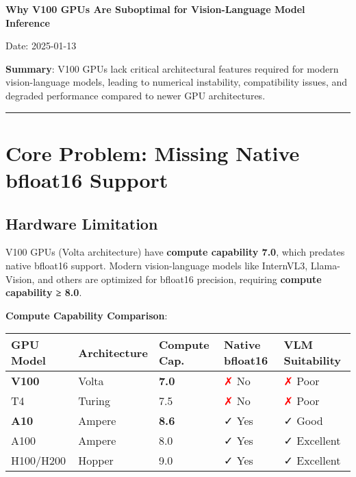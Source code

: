 \documentclass[11pt,a4paper]{article}
\newcommand{\cmark}{\textcolor{green!70!black}{✓}}
\newcommand{\xmark}{\textcolor{red}{✗}}
\begin{document}
\begin{center}
{\LARGE\bfseries Why V100 GPUs Are Suboptimal for Vision-Language Model Inference}

\vspace{0.5cm}

{\large Date: 2025-01-13}

\vspace{0.3cm}

\begin{minipage}{0.9\textwidth}
\textbf{Summary}: V100 GPUs lack critical architectural features required for modern vision-language models, leading to numerical instability, compatibility issues, and degraded performance compared to newer GPU architectures.
\end{minipage}
\end{center}

\vspace{0.5cm}
\hrule
\vspace{0.5cm}

\section{Core Problem: Missing Native bfloat16 Support}

\subsection{Hardware Limitation}

V100 GPUs (Volta architecture) have \textbf{compute capability 7.0}, which predates native bfloat16 support. Modern vision-language models like InternVL3, Llama-Vision, and others are optimized for bfloat16 precision, requiring \textbf{compute capability ≥ 8.0}.

\vspace{0.3cm}
\noindent\textbf{Compute Capability Comparison}:

\begin{table}[h]
\centering
\begin{tabular}{lllll}
\toprule
\textbf{GPU Model} & \textbf{Architecture} & \textbf{Compute Cap.} & \textbf{Native bfloat16} & \textbf{VLM Suitability} \\
\midrule
\textbf{V100} & Volta & \textbf{7.0} & \xmark{} No & \xmark{} Poor \\
T4 & Turing & 7.5 & \xmark{} No & \xmark{} Poor \\
\textbf{A10} & Ampere & \textbf{8.6} & \cmark{} Yes & \cmark{} Good \\
A100 & Ampere & 8.0 & \cmark{} Yes & \cmark{} Excellent \\
H100/H200 & Hopper & 9.0 & \cmark{} Yes & \cmark{} Excellent \\
\bottomrule
\end{tabular}
\end{table}
\end{document}
